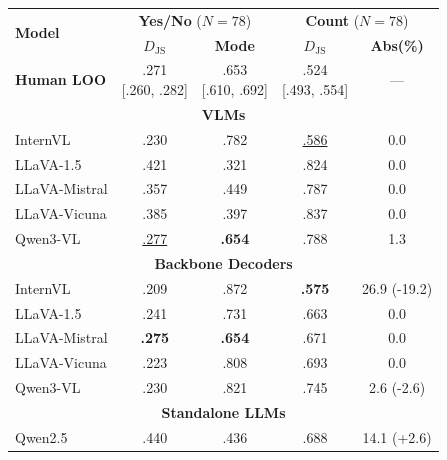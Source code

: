 \begin{table}[t]
\centering
\small
\setlength{\tabcolsep}{2.2pt}
\renewcommand{\arraystretch}{0.95}

\begin{tabular}{lcc@{\hspace{6pt}}cc}
\toprule
\multirow{2}{*}{\textbf{Model}} &
\multicolumn{2}{c}{\textbf{Yes/No} ($N{=}78$)} &
\multicolumn{2}{c}{\textbf{Count} ($N{=}78$)} \\
\cmidrule(lr){2-3}\cmidrule(lr){4-5}
& \textbf{$D_{\mathrm{JS}}$} & \textbf{Mode} & \textbf{$D_{\mathrm{JS}}$} & \textbf{Abs(\%)} \\
\midrule
\textbf{Human LOO} & \makecell[c]{.271 \\ {\scriptsize [.260, .282]}} & \makecell[c]{.653 \\ {\scriptsize [.610, .692]}} & \makecell[c]{.524 \\ {\scriptsize [.493, .554]}} & --- \\
\midrule
\multicolumn{5}{c}{\textbf{VLMs}} \\
\midrule
InternVL & \cellcolor{orange!30}.230 & \cellcolor{orange!30}.782 & \underline{.586} & 0.0 \\
LLaVA-1.5 & .421 & .321 & .824 & 0.0 \\
LLaVA-Mistral & .357 & .449 & .787 & 0.0 \\
LLaVA-Vicuna & .385 & .397 & .837 & 0.0 \\
Qwen3-VL & \cellcolor{green!20}\underline{.277} & \cellcolor{green!20}\textbf{.654} & .788 & 1.3 \\
\midrule
\multicolumn{5}{c}{\textbf{Backbone Decoders}} \\
\midrule
InternVL & \cellcolor{orange!30}.209 & \cellcolor{orange!30}.872 & \textbf{.575} & 26.9 {\scriptsize (\textcolor{cyan!50!black}{-19.2})} \\
LLaVA-1.5 & \cellcolor{orange!30}.241 & \cellcolor{orange!30}.731 & .663 & 0.0 \\
LLaVA-Mistral & \cellcolor{green!20}\textbf{.275} & \cellcolor{green!20}\textbf{.654} & .671 & 0.0 \\
LLaVA-Vicuna & \cellcolor{orange!30}.223 & \cellcolor{orange!30}.808 & .693 & 0.0 \\
Qwen3-VL & \cellcolor{orange!30}.230 & \cellcolor{orange!30}.821 & .745 & 2.6 {\scriptsize (\textcolor{cyan!50!black}{-2.6})} \\
\midrule
\multicolumn{5}{c}{\textbf{Standalone LLMs}} \\
\midrule
Qwen2.5 & .440 & .436 & .688 & 14.1 {\scriptsize (\textcolor{red!70!black}{+2.6})} \\

\end{tabular}
\end{table}
